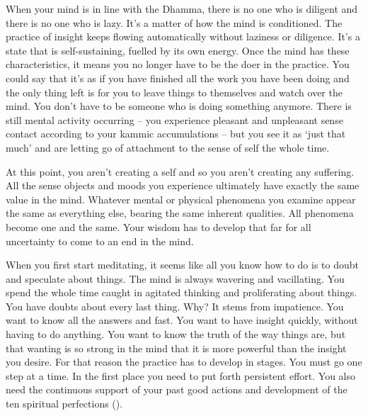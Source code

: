 When your mind is in line with the Dhamma, there is no one who is diligent and there is no one who is lazy. It's a matter of how the mind is conditioned. The practice of insight keeps flowing automatically without laziness or diligence. It's a state that is self-sustaining, fuelled by its own energy. Once the mind has these characteristics, it means you no longer have to be the doer in the practice. You could say that it's as if you have finished all the work you have been doing and the only thing left is for you to leave things to themselves and watch over the mind. You don't have to be someone who is doing something anymore. There is still mental activity occurring -- you experience pleasant and unpleasant sense contact according to your kammic accumulations -- but you see it as `just that much' and are letting go of attachment to the sense of self the whole time.

At this point, you aren't creating a self and so you aren't creating any suffering. All the sense objects and moods you experience ultimately have exactly the same value in the mind. Whatever mental or physical phenomena you examine appear the same as everything else, bearing the same inherent qualities. All phenomena become one and the same. Your wisdom has to develop that far for all uncertainty to come to an end in the mind. 

When you first start meditating, it seems like all you know how to do is to doubt and speculate about things. The mind is always wavering and vacillating. You spend the whole time caught in agitated thinking and proliferating about things. You have doubts about every last thing. Why? It stems from impatience. You want to know all the answers and fast. You want to have insight quickly, without having to do anything. You want to know the truth of the way things are, but that wanting is so strong in the mind that it is more powerful than the insight you desire. For that reason the practice has to develop in stages. You must go one step at a time. In the first place you need to put forth persistent effort. You also need the continuous support of your past good actions and development of the ten spiritual perfections ().

